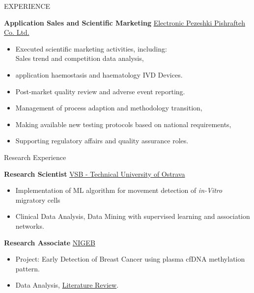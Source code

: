 \documentclass{resume}
\begin{document}
\begin{rSection}{EXPERIENCE}
\item \textbf{Application Sales and Scientific Marketing} \hfill {\href{https://www.sysmex-europe.com/company/contacts/distributors.html}{Electronic Pezeshki Pishrafteh Co. Ltd.}}
\begin{itemize}
    \itemsep -2.22pt {} 
     \item Executed scientific marketing activities, including:\\
            Sales trend and competition data analysis, 
     \item application haemostasis and haematology IVD Devices.
     \item Post-market quality review and adverse event reporting.
     \item Management of process adaption and methodology transition,
     \item Making available new testing protocols based on national requirements,
     \item Supporting regulatory affairs and quality assurance roles.
\end{itemize}
\end{rSection}

\begin{rSection}{Research Experience}
\vspace{-1em}
\item \textbf{Research Scientist} \hfill \href{https://www.vsb.cz/en/university/contacts-maps-parking}{VSB - Technical University of Ostrava}
    \begin{itemize}
        \itemsep -2.22pt {} 
         \item Implementation of ML algorithm for movement detection of \textit{in-Vitro} migratory cells 
         \item Clinical Data Analysis, Data Mining with supervised learning and association networks.
    \end{itemize}
 
\item \textbf{Research Associate} \hfill \href{http://www.nigeb.ac.ir/web/en}{NIGEB}
    \begin{itemize}
        \itemsep -2.22pt {} 
         \item Project: Early Detection of Breast Cancer using plasma cfDNA methylation pattern.
         \item Data Analysis, \href{https://ccij-online.org/article/serum-plasma-dna-methylation-pattern-and-early-detection-of-breast-cancer-336}{Literature Review}.
    \end{itemize}
\end{rSection}
\end{document}
